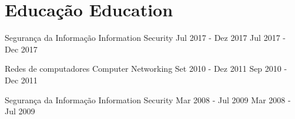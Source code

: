 \section{
    {Educação}
    {Education}
  }
  \vspace{3pt}
  \resumeSubHeadingListStart

    \resumeSubheading
      {\educationUnisinos}{\citySaoLeopoldo}
      {%
          {Segurança da Informação}
          {Information Security}
      }%
      {%
          {Jul 2017 - Dez 2017}
          {Jul 2017 - Dec 2017}
      }

    \resumeSubheading
      {\educationCtai}{\cityFlorianopolis}
      {%
          {Redes de computadores}
          {Computer Networking}
      }%
      {%
          {Set 2010 - Dez 2011}
          {Sep 2010 - Dec 2011}
      }

    \resumeSubheading
      {\educationUnisinos}{\citySaoLeopoldo}
      {%
          {Segurança da Informação}
          {Information Security}
      }%
      {%
          {Mar 2008 - Jul 2009}
          {Mar 2008 - Jul 2009}
      }

  \resumeSubHeadingListEnd

